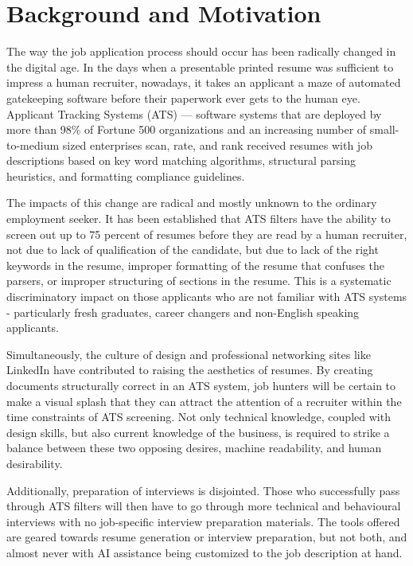 \documentclass[12pt, a4paper, oneside]{report}
\begin{document}
\section{Background and Motivation}

The way the job application process should occur has been radically changed in the digital age. In the days when a presentable printed resume was sufficient to impress a human recruiter, nowadays, it takes an applicant a maze of automated gatekeeping software before their paperwork ever gets to the human eye. Applicant Tracking Systems (ATS) --- software systems that are deployed by more than 98\% of Fortune 500 organizations and an increasing number of small-to-medium sized enterprises\cite{jobscan2021} scan, rate, and rank received resumes with job descriptions based on key word matching algorithms, structural parsing heuristics, and formatting compliance guidelines.

The impacts of this change are radical and mostly unknown to the ordinary employment seeker. It has been established that ATS filters have the ability to screen out up to 75 percent of resumes before they are read by a human recruiter\cite{jobscan2021}, not due to lack of qualification of the candidate, but due to lack of the right keywords in the resume, improper formatting of the resume that confuses the parsers, or improper structuring of sections in the resume. This is a systematic discriminatory impact on those applicants who are not familiar with ATS systems - particularly fresh graduates, career changers and non-English speaking applicants\cite{topresume2021}.

Simultaneously, the culture of design and professional networking sites like LinkedIn have contributed to raising the aesthetics of resumes. By creating documents structurally correct in an ATS system, job hunters will be certain to make a visual splash that they can attract the attention of a recruiter within the time constraints of ATS screening\cite{theladders2018}. Not only technical knowledge, coupled with design skills, but also current knowledge of the business, is required to strike a balance between these two opposing desires, machine readability, and human desirability.

Additionally, preparation of interviews is disjointed. Those who successfully pass through ATS filters will then have to go through more technical and behavioural interviews with no job-specific interview preparation materials. The tools offered are geared towards resume generation or interview preparation, but not both, and almost never with AI assistance being customized to the job description at hand.
\end{document}
